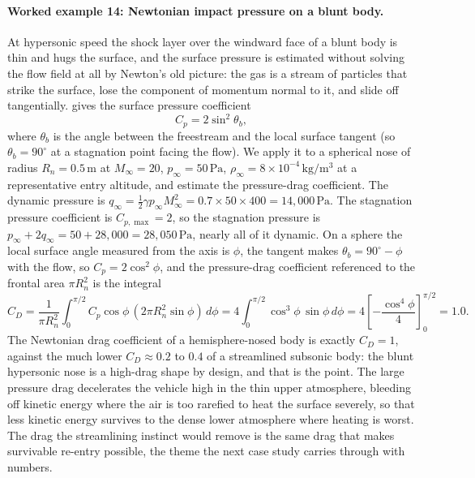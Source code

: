 \paragraph{Worked example 14: Newtonian impact pressure on a blunt
body.} At hypersonic speed the shock layer over the windward face of a
blunt body is thin and hugs the surface, and the surface pressure is
estimated without solving the flow field at all by Newton's old
picture: the gas is a stream of particles that strike the surface, lose
the component of momentum normal to it, and slide off tangentially.
 gives the surface pressure
coefficient
\[
C_p = 2\sin^2\theta_b,
\]
where $\theta_b$ is the angle between the freestream and the local
surface tangent (so $\theta_b = 90^{\circ}$ at a stagnation point
facing the flow). We apply it to a spherical nose of radius
$R_n = 0.5\,\si{\meter}$ at $M_\infty = 20$,
$p_\infty = 50\,\text{Pa}$, $\rho_\infty = 8\times 10^{-4}\,\si{
\kilogram\per\meter\cubed}$ at a representative entry altitude, and
estimate the pressure-drag coefficient. The dynamic pressure is
$q_\infty = \tfrac{1}{2}\gamma p_\infty M_\infty^2 =
0.7\times 50\times 400 = 14{,}000\,\text{Pa}$. The stagnation
pressure coefficient is $C_{p,\max} = 2$, so the stagnation pressure
is $p_\infty + 2 q_\infty = 50 + 28{,}000 = 28{,}050\,\text{Pa}$,
nearly all of it dynamic. On a sphere the local surface angle measured
from the axis is $\phi$, the tangent makes $\theta_b = 90^{\circ} -
\phi$ with the flow, so $C_p = 2\cos^2\phi$, and the pressure-drag
coefficient referenced to the frontal area $\pi R_n^2$ is the integral
\[
C_D = \frac{1}{\pi R_n^2}\int_0^{\pi/2} C_p \cos\phi\,(2\pi R_n^2
\sin\phi)\,d\phi
= 4\int_0^{\pi/2}\cos^3\phi\,\sin\phi\,d\phi
= 4\left[-\frac{\cos^4\phi}{4}\right]_0^{\pi/2} = 1.0.
\]
The Newtonian drag coefficient of a hemisphere-nosed body is exactly
$C_D = 1$, against the much lower $C_D \approx 0.2$ to $0.4$ of a
streamlined subsonic body: the blunt hypersonic nose is a high-drag
shape by design, and that is the point. The large pressure drag
decelerates the vehicle high in the thin upper atmosphere, bleeding off
kinetic energy where the air is too rarefied to heat the surface
severely, so that less kinetic energy survives to the dense lower
atmosphere where heating is worst. The drag the streamlining instinct
would remove is the same drag that makes survivable re-entry possible,
the theme the next case study carries through with numbers.

